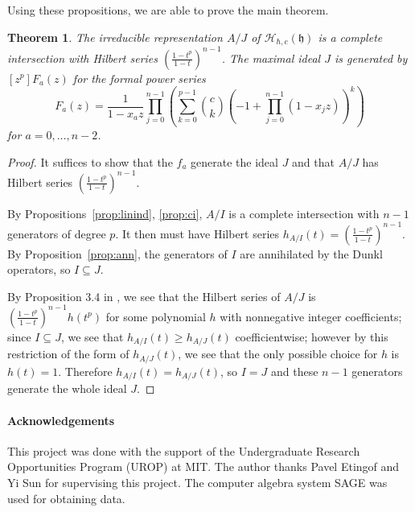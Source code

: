 \documentclass{article}
\numberwithin{equation}{section}
\newtheorem{theorem}[equation]{Theorem}
\newcommand{\h}{\mathfrak{h}}
\newcommand{\HH}{\mathcal{H}}
\begin{document}
Using these propositions, we are able to prove the main theorem.

\begin{theorem}\label{thm:main} The irreducible representation $A/J$  of $\HH_{\hbar,c}(\h)$ is a complete intersection with  Hilbert series $\left(\frac{1-t^p}{1-t}\right)^{n-1}$. The maximal ideal $J$ is generated by $[z^p]F_a(z)$ for the formal power series $$F_a(z)=\frac{1}{1-x_az} \prod_{j=0}^{n-1}\left( \sum_{k=0}^{p-1} \binom{c}{k}(-1+\prod_{j=0}^{n-1} (1-x_jz))^k\right)$$ for $a=0,\dots,n-2$.  \end{theorem} 

\begin{proof} It suffices to show that the $f_a$ generate the ideal $J$ and that $A/J$ has Hilbert series $\left(\frac{1-t^p}{1-t}\right)^{n-1}$. 

By Propositions~\ref{prop:linind}, \ref{prop:ci}, $A/I$ is a complete intersection with $n-1$ generators of degree $p$. It then must have Hilbert series $h_{A/I}(t)=\left(\frac{1-t^p}{1-t}\right)^{n-1}$. By Proposition~\ref{prop:ann}, the generators of $I$ are annihilated by the Dunkl operators, so $I \subseteq J$.

By Proposition 3.4 in \cite{BC1}, we see that the Hilbert series of $A/J$ is $\left(\frac{1-t^p}{1-t}\right)^{n-1}h(t^p)$ for some polynomial $h$ with nonnegative integer coefficients; since $I \subseteq J$, we see that $h_{A/I}(t) \ge h_{A/J}(t)$ coefficientwise; however by this restriction of the form of $h_{A/J}(t)$, we see that the only possible choice for $h$ is $h(t)=1$. Therefore $h_{A/I}(t)=h_{A/J}(t)$, so $I=J$ and these $n-1$ generators generate the whole ideal $J$.

\end{proof}



\paragraph{Acknowledgements} This project was done with the support of the Undergraduate Research Opportunities Program (UROP) at MIT. The author thanks Pavel Etingof and Yi Sun for supervising this project. The computer algebra system SAGE was used for obtaining data.
\end{document}
